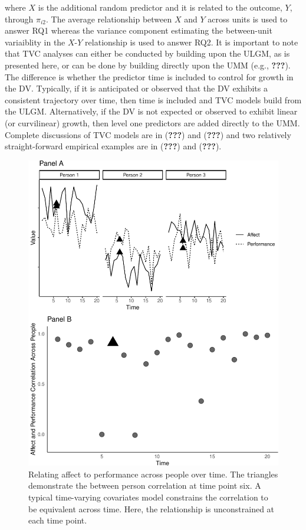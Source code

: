 \documentclass[english,,man]{apa6}
\begin{document}
\noindent \noindent where \(X\) is the additional random predictor and it is related to the outcome, \(Y\), through \(\pi_{i2}\). The average relationship between \(X\) and \(Y\) across units is used to answer RQ1 whereas the variance component estimating the between-unit variaiblity in the \(X\)-\(Y\) relationship is used to answer RQ2. It is important to note that TVC analyses can either be conducted by building upon the ULGM, as is presented here, or can be done by building directly upon the UMM (e.g., {\textbf{???}}). The difference is whether the predictor time is included to control for growth in the DV. Typically, if it is anticipated or observed that the DV exhibits a consistent trajectory over time, then time is included and TVC models build from the ULGM. Alternatively, if the DV is not expected or observed to exhibit linear (or curvilinear) growth, then level one predictors are added directly to the UMM. Complete discussions of TVC models are in ({\textbf{???}}) and ({\textbf{???}}) and two relatively straight-forward empirical examples are in ({\textbf{???}}) and ({\textbf{???}}).

\begin{figure}
\centering
\includegraphics{figures/unnamed-chunk-15-1.pdf}
\caption{\label{fig:unnamed-chunk-15}Relating affect to performance across people over time. The triangles demonstrate the between person correlation at time point six. A typical time-varying covariates model constrains the correlation to be equivalent across time. Here, the relationship is unconstrained at each time point.\label{relation_tvc}}
\end{figure}
\end{document}
